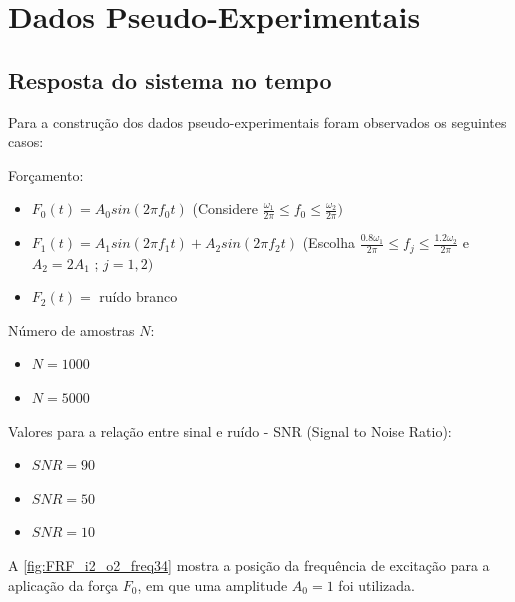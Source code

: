 \chapter{Dados Pseudo-Experimentais}

\section{Resposta do sistema no tempo} \label{Resposta do sistema no tempo}

Para a construção dos dados pseudo-experimentais foram observados os seguintes casos:

Forçamento:
\begin{itemize}
	\item $F_0(t) = A_0 sin(2\pi f_0 t)$ 
	(Considere $\frac{\omega_1}{2\pi} \leq f_0 \leq \frac{\omega_2}{2\pi})$ 
	\item $F_1(t) = A_1 sin(2\pi f_1 t) + A_2 sin(2\pi f_2 t)$ 
	(Escolha 
	$\frac{0.8 \omega_1}{2\pi} \leq f_j \leq \frac{1.2 \omega_2}{2\pi}$ 
	e
	$A_2 = 2A_1$
	;
	$ j = 1, 2)$
	\item $F_2(t) = $ ruído branco
\end{itemize}

Número de amostras $N$:
\begin{itemize}
	\item $N = 1000$
	\item $N = 5000$
\end{itemize}

Valores para a relação entre sinal e ruído -  SNR (Signal to Noise Ratio):
\begin{itemize}
	\item $SNR = 90$
	\item $SNR = 50$
	\item $SNR = 10$
\end{itemize}

A \cref{fig:FRF_i2_o2_freq34} mostra a posição da frequência de excitação para a aplicação da força $F_0$, em que uma amplitude $A_0 = 1$ foi utilizada.

